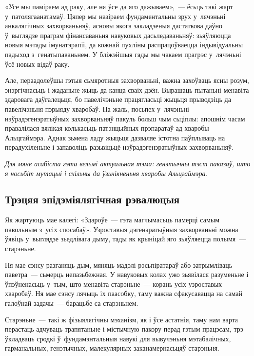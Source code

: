 
«Усе мы паміраем ад раку, але ня ўсе да яго дажываем»,~--- ёсьць такі жарт у~патолягаанатамаў. Цяпер мы назіраем фундаментальны зрух у~лячэньні анкалягічных захворваньняў, асновы якога закладзеныя дастаткова даўно ў~выглядзе праграм фінансаваньня навуковых дасьледаваньняў: зьяўляюцца новыя мэтады імунатэрапіі, да кожнай пухліны распрацоўваецца індывідуальны падыход з~генатыпаваньнем. У бліжэйшыя гады мы чакаем прагрэс у~лячэньні ўсё новых відаў раку.

Але, пераадолеўшы гэтыя сьмяротныя захворваньні, важна захоўваць ясны розум, энэргічнасьць і жаданьне жыць да канца сваіх дзён. Вырашаць пытаньні менавіта здаровага даўгалецьця, бо павелічэньне працягласьці жыцьця прыводзіць да павелічэньня пэрыяду хваробаў. На жаль, посьпех у~лячэньні нэўрадэгенэратыўных захворваньняў пакуль больш чым сьціплы: апошнім часам правалілася вялікая колькасьць патэнцыйных прэпаратаў ад хваробы Альцгаймэра. Аднак зьмена ладу жыцьця дазваляе істотна паўплываць на перадухіленьне і запаволіць разьвіцьцё нэўрадэгенэратыўных захворваньняў. 

\emph{Для мяне асабіста гэта вельмі актуальная тэма: генэтычны тэст паказаў, што я носьбіт мутацыі і схільны да ўзьнікненьня хваробы Альцгаймэра.}

\subsection*{Трэцяя эпідэміялягічная рэвалюцыя}

Як жартуюць мае калегі: «Здароўе~--- гэта магчымасьць памерці самым павольным з~усіх спосабаў». Узроставыя дэгенэратыўныя захворваньні можна ўявіць у~выглядзе зьедлівага дыму, тады як крыніцай яго зьяўляецца полымя~--- старэньне.

Ня мае сэнсу разганяць дым, мяняць мадэлі рэсьпіратараў або затрымліваць паветра~--- сьмерць непазьбежная. У навуковых колах ужо зьявілася разуменьне і ўпэўненасьць у~тым, што менавіта старэньне~--- корань усіх узроставых хваробаў. Ня мае сэнсу лячыць іх паасобку, таму важна сфакусавацца на самай галоўнай задачы~--- барацьбе са старэньнем.

Старэньне~--- такі ж фізыялягічны мэханізм, як і ўсе астатнія, таму нам варта перастаць адчуваць трапятаньне і містычную пакору перад гэтым працэсам, трэ ўкладваць сродкі ў~фундамэнтальныя навукі для вывучэньня мэтабалічных, гарманальных, генэтычных, малекулярных заканамернасьцяў старэньня.


